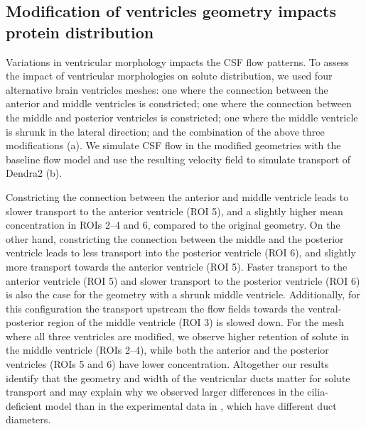 \documentclass[fleqn]{wlscirep}
\begin{document}
\subsection*{Modification of ventricles geometry impacts protein distribution}
Variations in ventricular morphology impacts the CSF flow patterns.
To assess the impact of ventricular morphologies on solute distribution,
we used four alternative brain ventricles meshes:
one where the connection between the anterior and middle ventricles is constricted;
one where the connection between the middle and posterior ventricles is constricted;
one where the middle ventricle is shrunk in the lateral direction;
and the combination of the above three modifications (a).
We simulate CSF flow in the modified geometries with the baseline flow model
and use the resulting velocity field to simulate transport of Dendra2
(b).

Constricting the connection between the anterior and middle ventricle leads to
slower transport to the anterior ventricle (ROI 5),
and a slightly higher mean concentration in ROIs 2--4 and 6, compared to the original geometry.
On the other hand, constricting the connection between the middle and the posterior ventricle
leads to less transport into the posterior ventricle (ROI 6),
and slightly more transport towards the anterior ventricle (ROI 5).
Faster transport to the anterior ventricle (ROI 5) and slower transport to the
posterior ventricle (ROI 6) is also the case for the geometry with a shrunk middle ventricle.
Additionally, for this configuration the transport upstream the flow fields towards the
ventral-posterior region of the middle ventricle (ROI 3) is slowed down.
For the mesh where all three ventricles are modified,
we observe higher retention of solute in the middle ventricle (ROIs 2--4),
while both the anterior and the posterior ventricles (ROIs 5 and 6) have lower concentration.
Altogether our results identify that the geometry and width of the ventricular ducts matter
for solute transport and may explain why we observed larger differences
in the cilia-deficient model than in the experimental data in
, which have different duct diameters.
\end{document}
